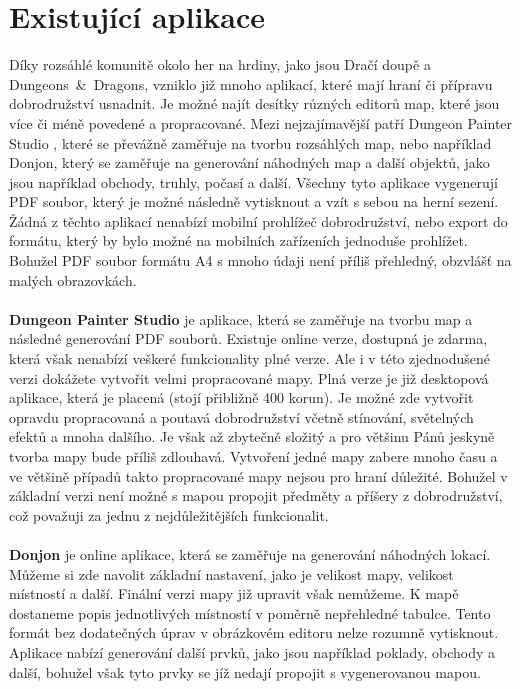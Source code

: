 \documentclass[thesis=B,czech]{resources/FITthesis}[2012/06/26]
\begin{document}
	\section{Existující aplikace}
Díky rozsáhlé komunitě okolo her na hrdiny, jako jsou Dračí doupě a Dungeons~\&~Dragons, vzniklo již mnoho aplikací, které mají hraní či přípravu dobrodružství usnadnit. Je možné najít desítky různých editorů map, které jsou více či méně povedené a propracované. Mezi nejzajímavější patří  Dungeon Painter Studio \cite{dungeoPainterStudio}, které se převážně zaměřuje na tvorbu rozsáhlých map, nebo například Donjon\cite{donjon}, který se zaměřuje na generování náhodných map a další objektů, jako jsou například obchody, truhly, počasí a další. Všechny tyto aplikace vygenerují PDF soubor, který je možné následně vytisknout a vzít s sebou na herní sezení. Žádná z těchto aplikací nenabízí mobilní prohlížeč dobrodružství, nebo export do formátu, který by bylo možné na mobilních zařízeních jednoduše prohlížet. Bohužel PDF soubor formátu A4 s mnoho údaji není příliš přehledný, obzvlášť na malých obrazovkách. \\
\\
\textbf{Dungeon Painter Studio} je aplikace, která se zaměřuje na tvorbu map a následné generování PDF souborů. Existuje online verze, dostupná je zdarma, která však nenabízí veškeré funkcionality plné verze. Ale i v této zjednodušené verzi dokážete vytvořit velmi propracované mapy. Plná verze je již desktopová aplikace, která je placená (stojí  přibližně 400 korun). Je možné zde vytvořit opravdu propracovaná a poutavá dobrodružství včetně stínování, světelných efektů a mnoha dalšího. Je však až zbytečně složitý a pro většinu Pánů jeskyně tvorba mapy bude příliš zdlouhavá. Vytvoření jedné mapy zabere mnoho času a ve většině případů takto propracované mapy nejsou pro hraní důležité. Bohužel v základní verzi není možné s mapou propojit předměty a příšery z dobrodružství, což považuji za jednu z nejdůležitějších funkcionalit. \\
\\
\textbf{Donjon} je online aplikace, která se zaměřuje na generování náhodných lokací. Můžeme si zde navolit základní nastavení, jako je velikost mapy, velikost místností a další. Finální verzi mapy již upravit však nemůžeme. K mapě dostaneme popis jednotlivých místností v poměrně nepřehledné tabulce. Tento formát bez dodatečných úprav v obrázkovém editoru nelze rozumně vytisknout. Aplikace nabízí generování další prvků, jako jsou například poklady, obchody a další, bohužel však tyto prvky se jíž nedají propojit s vygenerovanou mapou. 
\end{document}
